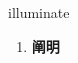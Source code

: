 
\begin{frame}
{\huge illuminate}
\begin{center}
\begin{enumerate}\Large
  \item \textbf{阐明}
\end{enumerate}
\end{center}
\end{frame}
